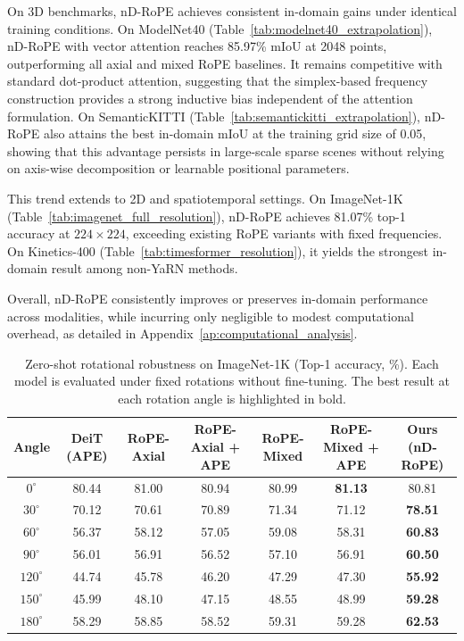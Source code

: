 \documentclass{article}
\theoremstyle{plain}
\theoremstyle{definition}
\theoremstyle{remark}
\begin{document}
On 3D benchmarks, nD-RoPE achieves consistent in-domain gains under identical training conditions. On ModelNet40 (Table~\ref{tab:modelnet40_extrapolation}), nD-RoPE with vector attention reaches 85.97\% mIoU at 2048 points, outperforming all axial and mixed RoPE baselines. It remains competitive with standard dot-product attention, suggesting that the simplex-based frequency construction provides a strong inductive bias independent of the attention formulation. On SemanticKITTI (Table~\ref{tab:semantickitti_extrapolation}), nD-RoPE also attains the best in-domain mIoU at the training grid size of 0.05, showing that this advantage persists in large-scale sparse scenes without relying on axis-wise decomposition or learnable positional parameters.

This trend extends to 2D and spatiotemporal settings. On ImageNet-1K (Table~\ref{tab:imagenet_full_resolution}), nD-RoPE achieves 81.07\% top-1 accuracy at $224 \times 224$, exceeding existing RoPE variants with fixed frequencies. On Kinetics-400 (Table~\ref{tab:timesformer_resolution}), it yields the strongest in-domain result among non-YaRN methods. 

Overall, nD-RoPE consistently improves or preserves in-domain performance across modalities, while incurring only negligible to modest computational overhead, as detailed in Appendix~\ref{ap:computational_analysis}.

\begin{table}[t]
\centering
\caption{Zero-shot rotational robustness on ImageNet-1K (Top-1 accuracy, \%).
Each model is evaluated under fixed rotations without fine-tuning.
The best result at each rotation angle is highlighted in bold.}
\label{tab:rotation_robustness}
\small
\begin{tabular}{c|cccccc}
\toprule
Angle
& DeiT (APE)
& RoPE-Axial
& RoPE-Axial + APE
& RoPE-Mixed
& RoPE-Mixed + APE
& Ours (nD-RoPE) \\
\midrule
$0^\circ$   & 80.44 & 81.00 & 80.94 & 80.99 & \textbf{81.13} & 80.81 \\
$30^\circ$  & 70.12 & 70.61 & 70.89 & 71.34 & 71.12 & \textbf{78.51} \\
$60^\circ$  & 56.37 & 58.12 & 57.05 & 59.08 & 58.31 & \textbf{60.83} \\
$90^\circ$  & 56.01 & 56.91 & 56.52 & 57.10 & 56.91 & \textbf{60.50} \\
$120^\circ$ & 44.74 & 45.78 & 46.20 & 47.29 & 47.30 & \textbf{55.92} \\
$150^\circ$ & 45.99 & 48.10 & 47.15 & 48.55 & 48.99 & \textbf{59.28} \\
$180^\circ$ & 58.29 & 58.85 & 58.52 & 59.31 & 59.28 & \textbf{62.53} \\
\bottomrule
\end{tabular}
\end{table}
\end{document}

